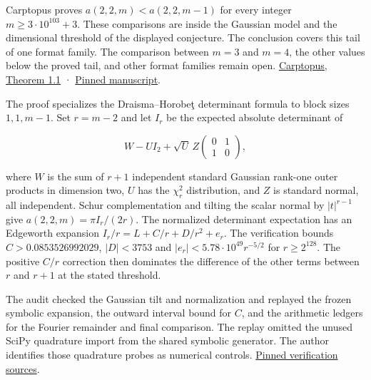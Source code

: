 \documentclass[11pt,a4paper]{article}
\begin{document}
Carptopus proves \(a(2,2,m)< a(2,2,m-1)\) for every integer
\(m\ge3\cdot10^{103}+3\). These comparisons are inside the Gaussian
model and the dimensional threshold of the displayed conjecture. The
conclusion covers this tail of one format family. The comparison between
\(m=3\) and \(m=4\), the other values below the proved tail, and other
format families remain open.
\href{https://doi.org/10.5281/zenodo.23353313}{Carptopus, Theorem 1.1} ·
\href{https://github.com/Carptopus/MathExplore-Notes/blob/12ba9e48fd64e6721588b4db4f1972b8af118674/research/effective-eventual-monotonicity-22m-tensor-slice/manuscript.md}{Pinned
manuscript}.

The proof specializes the Draisma--Horobeţ determinant formula to block
sizes \(1,1,m-1\). Set \(r=m-2\) and let \(I_r\) be the expected
absolute determinant of

\[W-U I_2+\sqrt U\,Z\begin{pmatrix}0&1\\1&0\end{pmatrix},\]

where \(W\) is the sum of \(r+1\) independent standard Gaussian rank-one
outer products in dimension two, \(U\) has the \(\chi_r^2\)
distribution, and \(Z\) is standard normal, all independent. Schur
complementation and tilting the scalar normal by \(|t|^{r-1}\) give
\(a(2,2,m)=\pi I_r/(2r)\). The normalized determinant expectation has an
Edgeworth expansion \(I_r/r=L+C/r+D/r^2+e_r\). The verification bounds
\(C>0.0853526992029\), \(|D|<3753\) and
\(|e_r|<5.78\cdot10^{49}r^{-5/2}\) for \(r\ge2^{128}\). The positive
\(C/r\) correction then dominates the difference of the other terms
between \(r\) and \(r+1\) at the stated threshold.

The audit checked the Gaussian tilt and normalization and replayed the
frozen symbolic expansion, the outward interval bound for \(C\), and the
arithmetic ledgers for the Fourier remainder and final comparison. The
replay omitted the unused SciPy quadrature import from the shared
symbolic generator. The author identifies those quadrature probes as
numerical controls.
\href{https://github.com/Carptopus/MathExplore-Notes/tree/12ba9e48fd64e6721588b4db4f1972b8af118674/research/effective-eventual-monotonicity-22m-tensor-slice/verification}{Pinned
verification sources}.
\end{document}
